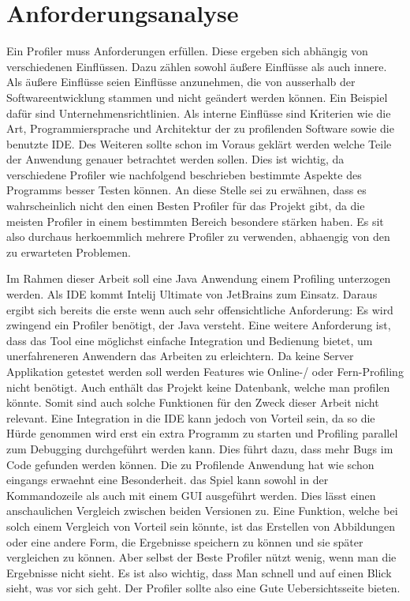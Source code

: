 \documentclass{article}
\begin{document}
\section{Anforderungsanalyse}
Ein Profiler muss Anforderungen erfüllen. Diese ergeben sich abhängig von verschiedenen Einflüssen. Dazu zählen sowohl äußere Einflüsse als auch innere. Als äußere Einflüsse seien Einflüsse anzunehmen, die von ausserhalb der Softwareentwicklung stammen und nicht geändert werden können. Ein Beispiel dafür sind Unternehmensrichtlinien. Als interne Einflüsse sind Kriterien wie die Art, Programmiersprache und Architektur der zu profilenden Software sowie die benutzte IDE. Des Weiteren sollte schon im Voraus geklärt werden welche Teile der Anwendung genauer betrachtet werden sollen. Dies ist wichtig, da verschiedene Profiler wie nachfolgend beschrieben bestimmte Aspekte des Programms besser Testen können. An diese Stelle sei zu erwähnen, dass es wahrscheinlich nicht den einen Besten Profiler für das Projekt gibt, da die meisten Profiler in einem bestimmten Bereich besondere stärken haben. Es sit also durchaus herkoemmlich mehrere Profiler zu verwenden, abhaengig von den zu erwarteten Problemen. 


Im Rahmen dieser Arbeit soll eine Java Anwendung einem Profiling unterzogen werden. Als IDE kommt Intelij Ultimate von JetBrains zum Einsatz. Daraus ergibt sich bereits die erste  wenn auch sehr offensichtliche Anforderung: Es wird zwingend ein Profiler benötigt, der Java versteht. Eine weitere Anforderung ist, dass das Tool eine möglichst einfache Integration und Bedienung bietet, um unerfahreneren Anwendern das Arbeiten zu erleichtern. Da keine Server Applikation getestet werden soll werden Features wie Online-/ oder Fern-Profiling nicht benötigt. Auch enthält das Projekt keine Datenbank, welche man profilen könnte. Somit sind auch solche Funktionen für den Zweck dieser Arbeit nicht relevant. Eine Integration in die IDE kann jedoch von Vorteil sein, da so die Hürde genommen wird erst ein extra Programm zu starten und Profiling parallel zum Debugging durchgeführt werden kann. Dies führt dazu, dass mehr Bugs im Code gefunden werden können. Die zu Profilende Anwendung hat wie schon eingangs erwaehnt eine Besonderheit. das Spiel kann sowohl in der Kommandozeile als auch mit einem GUI ausgeführt werden.
Dies lässt einen anschaulichen Vergleich zwischen beiden Versionen zu. Eine Funktion, welche bei solch einem Vergleich von Vorteil sein könnte, ist das Erstellen von Abbildungen oder eine andere Form, die Ergebnisse speichern zu können und sie später vergleichen zu können.
Aber selbst der Beste Profiler nützt wenig, wenn man die Ergebnisse nicht sieht. Es ist also wichtig, dass Man schnell und auf einen Blick sieht, was vor sich geht. Der Profiler sollte also eine Gute Uebersichtsseite bieten. 
\end{document}
